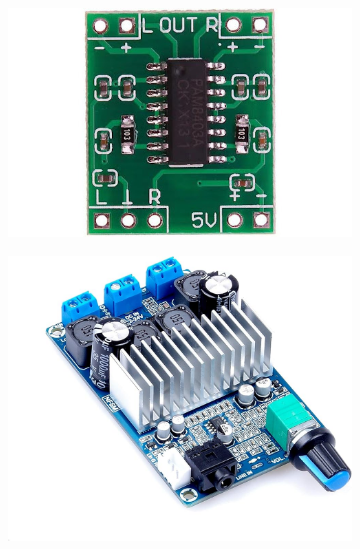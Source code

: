 \begin{figure}[h!]
	\centering
	\begin{subfigure}[b]{0.22\textwidth}
		\centering
		\includegraphics[width=\textwidth]{assets/ch2/PAM8403}
		\caption{}
		\label{fig:pam8403}
	\end{subfigure}
	\hfill
	\begin{subfigure}[b]{0.22\textwidth}
		\centering
		\includegraphics[width=\textwidth]{assets/ch2/TPA3116D2}
		\caption{}
		\label{fig:tpa3116d2}
	\end{subfigure}
	\hfill
	\begin{subfigure}[b]{0.22\textwidth}
		\centering

\end{subfigure}
\end{figure}
